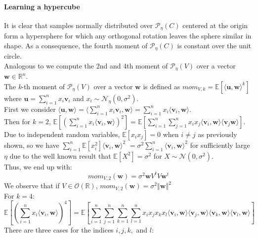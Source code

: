 \documentclass[12 pt]{article}        	%
\newcommand{\PP}[2][]{\mathcal{P}_{#1}(\mat{#2})}
\newcommand{\mat}[1]{\mathit{#1}}
\renewcommand{\vec}[1]{\mathbf{#1}}
\newcommand{\bb}[1]{\mathbb{#1}}
\begin{document}
\paragraph{Learning a hypercube}
It is clear that samples normally distributed over $\PP[\eta]{C}$ centered at the origin form a hypersphere for which any orthogonal rotation leaves the sphere similar in shape.
As a consequence, the fourth moment of $\PP[\eta]{C}$ is constant over the unit circle. \\ 
Analogous to \cite{NR09} we compute the 2nd and 4th moment of $\PP[\eta]{V}$ over a vector $\vec{w} \in \bb{R}^n$. \\
The \textit{k}-th moment of $\PP[\eta]{V}$ over a vector $\vec{w}$ is defined as $mom_{\mat{V}, k} = \bb{E}[\langle \vec{u}, \vec{w} \rangle ^k]$ where $\vec{u} = \sum_{i=1}^{n} x_i \vec{v}_i$ and $x_i \sim \mathcal{N}_{\eta}(0, \sigma^2)$. \\
First we consider $\langle \vec{u}, \vec{w} \rangle = \langle \sum_{i=1}^{n} x_i\vec{v}_i, \vec{w}\rangle = \sum_{i=1}^{n}x_i \langle\vec{v}_i, \vec{w} \rangle$. \\
Then for $k=2$, $\bb{E}[(\sum_{i=1}^{n}x_i \langle\vec{v}_i, \vec{w} \rangle)^2] = \bb{E}[\sum_{i=1}^{n} \sum_{j=1}^{n} x_i x_j \langle \vec{v}_i, \vec{w} \rangle \langle \vec{v}_j \vec{w} \rangle]$. \\ 
Due to independent random variables, $\bb{E}[x_i x_j] = 0$ when $i \neq j$ as previously shown, so we have $ \sum_{i=1}^{n}\bb{E}[x_i^2]\langle \vec{v}_i, \vec{w} \rangle^2$
$= \sigma^2 \sum_{i=1}^{n}\langle \vec{v}_i, \vec{w} \rangle^2$ for sufficiently large $\eta$ due to the well known result that $\bb{E}[X^2] = \sigma^2$ for $X \sim \mathcal{N}(0, \sigma^2)$. \\
Thus, we end up with:
\begin{equation}
mom_{\mat{V}, 2}(\vec{w}) = \sigma^2 \vec{w}\mat{V}^t\mat{V}\vec{w}^t
\end{equation}
We observe that if $\mat{V} \in \mathcal{O}(\bb{R})$, $mom_{\mat{V}, 2}(\vec{w}) = \sigma^2 \left \Vert \vec{w} \right \Vert^2$ \hfill \break \\
For $k=4$:
\[
    \bb{E}[(\sum_{i=1}^{n} x_i \langle \vec{v}_i, \vec{w} \rangle)^4] = \bb{E}[\sum_{i=1}^{n}\sum_{j=1}^{n}\sum_{k=1}^{n}\sum_{l=1}^{n}x_i x_j x_k x_l \langle \vec{v}_i, \vec{w} \rangle \langle \vec{v}_j, \vec{w} \rangle \langle \vec{v}_k, \vec{w} \rangle \langle \vec{v}_l, \vec{w} \rangle]
\]
There are three cases for the indices $i, j, k,$ and $l$:
\end{document}
